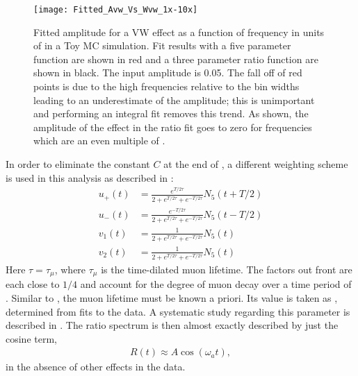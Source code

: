


    \begin{figure}[ht]
        \centering
        \texttt{[image: Fitted\_Avw\_Vs\_Wvw\_1x-10x]}
        \caption[Cancellation of effect in Ratio Method versus frequency]{Fitted amplitude for a VW effect as a function of frequency in units of \wa in a Toy MC simulation. Fit results with a five parameter function are shown in red and a three parameter ratio function are shown in black. The input amplitude is 0.05. The fall off of red points is due to the high frequencies relative to the bin widths leading to an underestimate of the amplitude; this is unimportant and performing an integral fit removes this trend. As shown, the amplitude of the effect in the ratio fit goes to zero for frequencies which are an even multiple of \wa.}
        \label{fig:CancellationInRatioMethod}
    \end{figure}



 In order to eliminate the constant $C$ at the end of , a different weighting scheme is used in this analysis as described in :
    \begin{equation}
    \begin{aligned}
        u_{+}(t) &= \frac{e^{T/2\tau}}{2 + e^{T/2\tau} + e^{-T/2\tau}} N_{5}(t+T/2) \\
        u_{-}(t) &= \frac{e^{-T/2\tau}}{2 + e^{T/2\tau} + e^{-T/2\tau}} N_{5}(t-T/2) \\
        v_{1}(t) &= \frac{1}{2 + e^{T/2\tau} + e^{-T/2\tau}} N_{5}(t) \\
        v_{2}(t) &= \frac{1}{2 + e^{T/2\tau} + e^{-T/2\tau}} N_{5}(t)
    \label{eqn:fourHistsInText}
    \end{aligned}
    \end{equation}
Here $\tau = \tau_{\mu}$, where $\tau_{\mu}$ is the time-dilated muon lifetime. The factors out front are each close to $1/4$ and account for the degree of muon decay over a time period of \Tatwo. Similar to \Ta, the muon lifetime must be known a priori. Its value is taken as , determined from fits to the data. A systematic study regarding this parameter is described in . The ratio spectrum is then almost exactly described by just the cosine term,
    \begin{align} \label{eq:threeparamratio}
        R(t) \approx A \cos(\omega_{a}t),
    \end{align}
in the absence of other effects in the data. 




